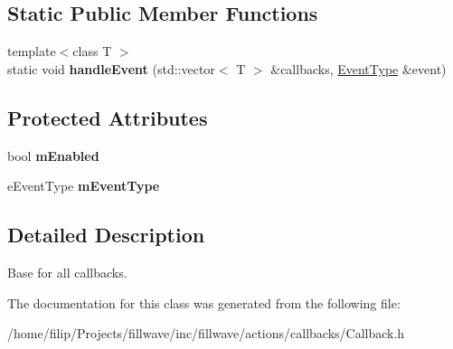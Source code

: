 \subsection*{Static Public Member Functions}
\begin{DoxyCompactItemize}
\item 
{\footnotesize template$<$class T $>$ }\\static void {\bfseries handle\+Event} (std\+::vector$<$ T $>$ \&callbacks, \hyperlink{classflw_1_1flf_1_1EventType}{Event\+Type} \&event)\hypertarget{classflw_1_1flf_1_1Callback_a33d6db4add745c812829d6f4fb7f44f6}{}\label{classflw_1_1flf_1_1Callback_a33d6db4add745c812829d6f4fb7f44f6}

\end{DoxyCompactItemize}
\subsection*{Protected Attributes}
\begin{DoxyCompactItemize}
\item 
bool {\bfseries m\+Enabled}\hypertarget{classflw_1_1flf_1_1Callback_a9b9c7d9c864288b467a6404551a5d82a}{}\label{classflw_1_1flf_1_1Callback_a9b9c7d9c864288b467a6404551a5d82a}

\item 
e\+Event\+Type {\bfseries m\+Event\+Type}\hypertarget{classflw_1_1flf_1_1Callback_a8902c09a9bb26ccb04ef3e9b4e598938}{}\label{classflw_1_1flf_1_1Callback_a8902c09a9bb26ccb04ef3e9b4e598938}

\end{DoxyCompactItemize}


\subsection{Detailed Description}
Base for all callbacks. 

The documentation for this class was generated from the following file\+:\begin{DoxyCompactItemize}
\item 
/home/filip/\+Projects/fillwave/inc/fillwave/actions/callbacks/Callback.\+h\end{DoxyCompactItemize}
